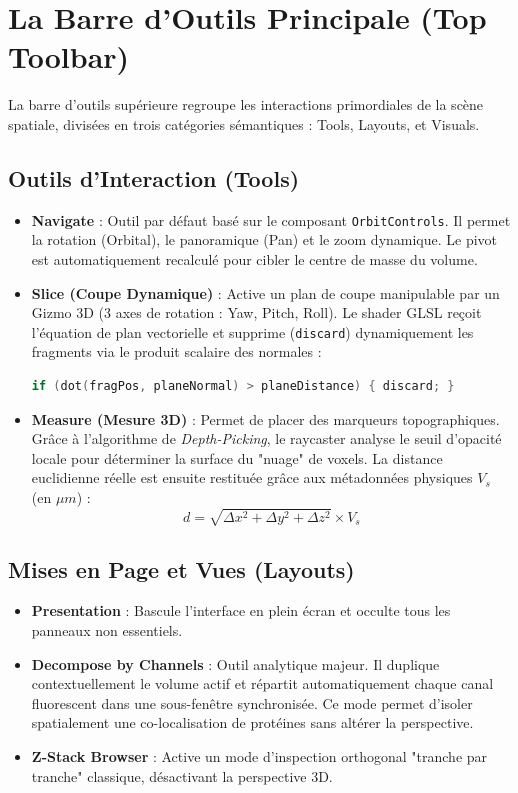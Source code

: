 \section{La Barre d'Outils Principale (Top Toolbar)}

La barre d'outils supérieure regroupe les interactions primordiales de la scène spatiale, divisées en trois catégories sémantiques : Tools, Layouts, et Visuals.

\subsection{Outils d'Interaction (Tools)}

\begin{itemize}
    \item \textbf{Navigate} : Outil par défaut basé sur le composant \texttt{OrbitControls}. Il permet la rotation (Orbital), le panoramique (Pan) et le zoom dynamique. Le pivot est automatiquement recalculé pour cibler le centre de masse du volume.
    \item \textbf{Slice (Coupe Dynamique)} : Active un plan de coupe manipulable par un Gizmo 3D (3 axes de rotation : Yaw, Pitch, Roll). Le shader GLSL reçoit l'équation de plan vectorielle et supprime (\texttt{discard}) dynamiquement les fragments via le produit scalaire des normales :
\begin{lstlisting}[language=C, caption=Clipping planaire en GLSL]
if (dot(fragPos, planeNormal) > planeDistance) { discard; }
\end{lstlisting}
    \item \textbf{Measure (Mesure 3D)} : Permet de placer des marqueurs topographiques. Grâce à l'algorithme de \textit{Depth-Picking}, le raycaster analyse le seuil d'opacité locale pour déterminer la surface du "nuage" de voxels. La distance euclidienne réelle est ensuite restituée grâce aux métadonnées physiques $V_s$ (en $\mu m$) :
\begin{equation}
d = \sqrt{\Delta x^2 + \Delta y^2 + \Delta z^2} \times V_s
\end{equation}
\end{itemize}

\subsection{Mises en Page et Vues (Layouts)}
\begin{itemize}
    \item \textbf{Presentation} : Bascule l'interface en plein écran et occulte tous les panneaux non essentiels.
    \item \textbf{Decompose by Channels} : Outil analytique majeur. Il duplique contextuellement le volume actif et répartit automatiquement chaque canal fluorescent dans une sous-fenêtre synchronisée. Ce mode permet d'isoler spatialement une co-localisation de protéines sans altérer la perspective.
    \item \textbf{Z-Stack Browser} : Active un mode d'inspection orthogonal "tranche par tranche" classique, désactivant la perspective 3D.
\end{itemize}

